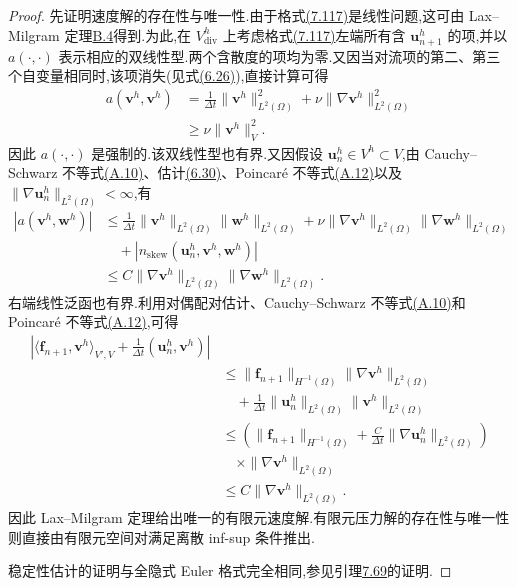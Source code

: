 \begin{proof}
先证明速度解的存在性与唯一性.由于格式\hyperref[eq:imex-euler-fully-discrete-scheme]{(7.117)}是线性问题,这可由 Lax--Milgram 定理\hyperref[thm:appendix-b-4]{B.4}得到.为此,在 $V_{\mathrm{div}}^h$ 上考虑格式\hyperref[eq:imex-euler-fully-discrete-scheme]{(7.117)}左端所有含 $\bm{u}_{n+1}^h$ 的项,并以 $a(\cdot,\cdot)$ 表示相应的双线性型.两个含散度的项均为零.又因当对流项的第二、第三个自变量相同时,该项消失(见式\hyperref[eq:steady-ns-discrete-skew-vanishing]{(6.26)}),直接计算可得
\[
\begin{aligned}
 a(\bm{v}^h,\bm{v}^h)
 &=\frac1{\Delta t}\|\bm{v}^h\|_{L^2(\Omega)}^2
   +\nu\|\nabla\bm{v}^h\|_{L^2(\Omega)}^2\\
 &\ge \nu\|\bm{v}^h\|_{V}^2.
\end{aligned}
\]
因此 $a(\cdot,\cdot)$ 是强制的.该双线性型也有界.又因假设 $\bm{u}_n^h\in V^h\subset V$,由 Cauchy--Schwarz 不等式\hyperref[eq:appendix-a-10]{(A.10)}、估计\hyperref[eq:steady-ns-conv-estimate-30]{(6.30)}、Poincaré 不等式\hyperref[eq:appendix-a-12]{(A.12)}以及 $\|\nabla\bm{u}_n^h\|_{L^2(\Omega)}<\infty$,有
\[
\begin{aligned}
 |a(\bm{v}^h,\bm{w}^h)|
 &\le \frac1{\Delta t}
       \|\bm{v}^h\|_{L^2(\Omega)}\|\bm{w}^h\|_{L^2(\Omega)}
     +\nu\|\nabla\bm{v}^h\|_{L^2(\Omega)}
          \|\nabla\bm{w}^h\|_{L^2(\Omega)}\\
 &\quad+\left|n_{\mathrm{skew}}(\bm{u}_n^h,
                       \bm{v}^h,\bm{w}^h)\right|\\
 &\le C\|\nabla\bm{v}^h\|_{L^2(\Omega)}
       \|\nabla\bm{w}^h\|_{L^2(\Omega)}.
\end{aligned}
\]
右端线性泛函也有界.利用对偶配对估计、Cauchy--Schwarz 不等式\hyperref[eq:appendix-a-10]{(A.10)}和 Poincaré 不等式\hyperref[eq:appendix-a-12]{(A.12)},可得
\[
\begin{aligned}
  \left|\langle\bm{f}_{n+1},\bm{v}^h\rangle_{V',V}
      +\frac1{\Delta t}(\bm{u}_n^h,\bm{v}^h)\right|\\
  &\le \|\bm{f}_{n+1}\|_{H^{-1}(\Omega)}
         \|\nabla\bm{v}^h\|_{L^2(\Omega)}\\
  &\quad+\frac1{\Delta t}
         \|\bm{u}_n^h\|_{L^2(\Omega)}
         \|\bm{v}^h\|_{L^2(\Omega)}\\
  &\le \left(\|\bm{f}_{n+1}\|_{H^{-1}(\Omega)}
        +\frac{C}{\Delta t}\|\nabla\bm{u}_n^h\|_{L^2(\Omega)}\right)\\
  &\quad\times\|\nabla\bm{v}^h\|_{L^2(\Omega)}\\
  &\le C\|\nabla\bm{v}^h\|_{L^2(\Omega)}.
\end{aligned}
\]
因此 Lax--Milgram 定理给出唯一的有限元速度解.有限元压力解的存在性与唯一性则直接由有限元空间对满足离散 inf-sup 条件推出.

稳定性估计的证明与全隐式 Euler 格式完全相同,参见引理\hyperref[lem:fully-discrete-backward-euler-existence-stability]{7.69}的证明.
\end{proof}

